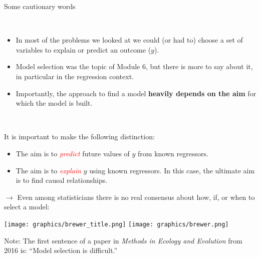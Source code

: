 \documentclass[10pt,ignorenonframetext,]{beamer}
\providecommand{\tightlist}{%
  \setlength{\itemsep}{0pt}\setlength{\parskip}{0pt}}
\begin{document}
\begin{frame}{Some cautionary words}
\protect\hypertarget{some-cautionary-words}{}

\(~\)

\begin{itemize}
\item
  In most of the problems we looked at we could (or had to) choose a set
  of variables to explain or predict an outcome (\(y\)).
\item
  Model selection was the topic of Module 6, but there is more to say
  about it, in particular in the regression context.
\item
  Importantly, the approach to find a model \textbf{heavily depends on
  the aim} for which the model is built.
\end{itemize}

\(~\)

It is important to make the following distinction:

\begin{itemize}
\tightlist
\item
  The aim is to \emph{\textcolor{red}{predict}} future values of \(y\)
  from known regressors.
\item
  The aim is to \emph{\textcolor{red}{explain}} \(y\) using known
  regressors. In this case, the ultimate aim is to find causal
  relationships.
\end{itemize}

\end{frame}

\begin{frame}

\(\rightarrow\) Even among statisticians there is no real consensus
about how, if, or when to select a model:

\vspace{2mm}

\texttt{[image: graphics/brewer\_title.png]}
\texttt{[image: graphics/brewer.png]}

Note: The first sentence of a paper in \emph{Methods in Ecology and
Evolution} from 2016 is: ``Model selection is difficult.''

\end{frame}
\end{document}
